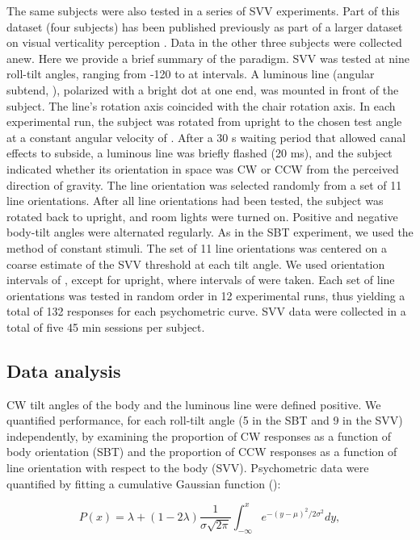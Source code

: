 The same subjects were also tested in a series of SVV experiments. Part of this dataset (four subjects) has been published previously as part of a larger dataset on visual verticality perception \cite{devrijer2009}. Data in the other three subjects were collected anew. Here we provide a brief summary of the paradigm. SVV was tested at nine roll-tilt angles, ranging from -120 to  at  intervals. A luminous line (angular subtend, ), polarized with a bright dot at one end, was mounted in front of the subject. The line's rotation axis coincided with the chair rotation axis. In each experimental run, the subject was rotated from upright to the chosen test angle at a constant angular velocity of . After a 30 \si{\second} waiting period that allowed canal effects to subside, a luminous line was briefly flashed (20 \si{\milli\second}), and the subject indicated whether its orientation in space was CW or CCW from the perceived direction of gravity. The line orientation was selected randomly from a set of 11 line orientations. After all line orientations had been tested, the subject was rotated back to upright, and room lights were turned on. Positive and negative body-tilt angles were alternated regularly. As in the SBT experiment, we used the method of constant stimuli. The set of 11 line orientations was centered on a coarse estimate of the SVV threshold at each tilt angle. We used orientation intervals of , except for upright, where intervals of  were taken. Each set of line orientations was tested in random order in 12 experimental runs, thus yielding a total of 132 responses for each psychometric curve. SVV data were collected in a total of five 45 min sessions per subject. 

\subsection{Data analysis}

CW tilt angles of the body and the luminous line were defined positive. We quantified performance, for each roll-tilt angle (5 in the SBT and 9 in the SVV) independently, by examining the proportion of CW responses as a function of body orientation (SBT) and the proportion of CCW responses as a function of line orientation with respect to the body (SVV). Psychometric data were quantified by fitting a cumulative Gaussian function (): 

\begin{equation}
\label{p1:eqn1}
P(x) = \lambda + (1 - 2\lambda) \frac{1}{\sigma \sqrt{2\pi}} \int_{-\infty}^{x}{e^{-(y-\mu)^2 / 2\sigma^2}}dy,
\end{equation}


